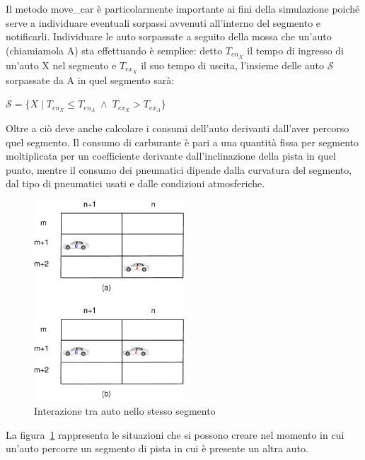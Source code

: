 \documentclass[11pt,a4paper]{report}
\begin{document}
Il metodo move\_car è particolarmente importante ai fini della simulazione poiché serve a individuare eventuali sorpassi avvenuti all'interno del segmento e notificarli. Individuare le auto sorpassate a seguito della mossa che un'auto (chiamiamola A) sta effettuando è semplice: detto $T_{en_X}$ il tempo di ingresso di un'auto X nel segmento e $T_{ex_X}$ il suo tempo di uscita, l'insieme delle auto $\mathcal{S}$ sorpassate da A in quel segmento sarà:
\begin{center}
$\mathcal{S} = \{ X \; | \; T_{en_X} \leq T_{en_A} \; \wedge \; T_{ex_X} > T_{ex_A}\}$
\end{center}
Oltre a ciò deve anche calcolare i consumi dell'auto derivanti dall'aver percorso quel segmento.
Il consumo di carburante è pari a una quantità fissa per segmento moltiplicata per un coefficiente derivante dall'inclinazione della pista in quel punto, mentre il consumo dei pneumatici dipende dalla curvatura del segmento, dal tipo di pneumatici usati e dalle condizioni atmosferiche.

\begin{center}
\begin{figure}
\includegraphics[width=0.5\textwidth]{diagrammi/Surpass}
\caption{Interazione tra auto nello stesso segmento}
\label{fig:surpass}
\end{figure}
\end{center}
La figura~\ref{fig:surpass} rappresenta le situazioni che si possono creare nel momento in cui un'auto percorre un segmento di pista in cui è presente un altra auto.
\end{document}
